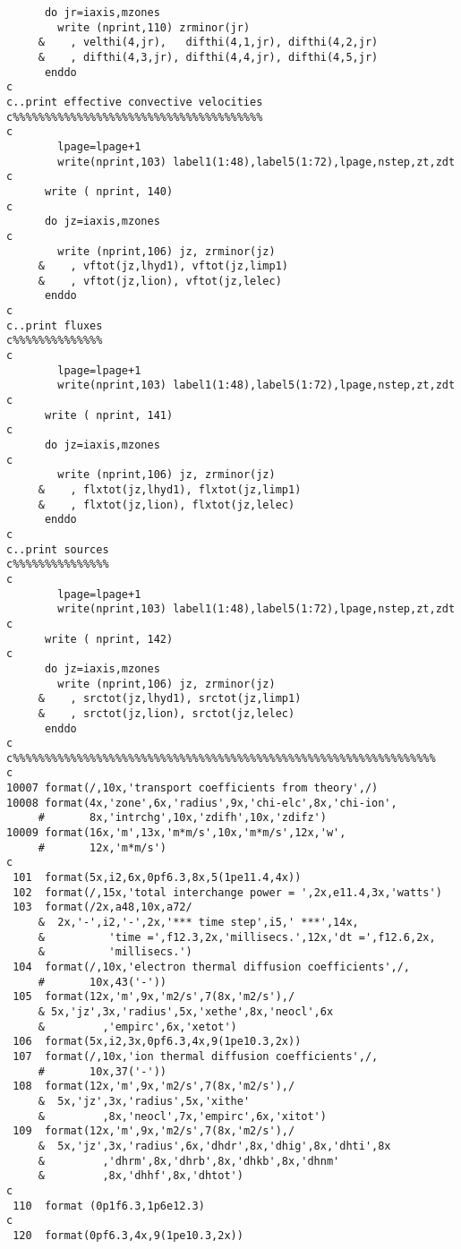 \begin{verbatim}
      do jr=iaxis,mzones
        write (nprint,110) zrminor(jr)
     &    , velthi(4,jr),   difthi(4,1,jr), difthi(4,2,jr)
     &    , difthi(4,3,jr), difthi(4,4,jr), difthi(4,5,jr)
      enddo
c
c..print effective convective velocities
c%%%%%%%%%%%%%%%%%%%%%%%%%%%%%%%%%%%%%%%
c
        lpage=lpage+1
        write(nprint,103) label1(1:48),label5(1:72),lpage,nstep,zt,zdt
c
      write ( nprint, 140)
c
      do jz=iaxis,mzones
c
        write (nprint,106) jz, zrminor(jz)
     &    , vftot(jz,lhyd1), vftot(jz,limp1)
     &    , vftot(jz,lion), vftot(jz,lelec)
      enddo
c
c..print fluxes
c%%%%%%%%%%%%%%
c
        lpage=lpage+1
        write(nprint,103) label1(1:48),label5(1:72),lpage,nstep,zt,zdt
c
      write ( nprint, 141)
c
      do jz=iaxis,mzones
c
        write (nprint,106) jz, zrminor(jz)
     &    , flxtot(jz,lhyd1), flxtot(jz,limp1)
     &    , flxtot(jz,lion), flxtot(jz,lelec)
      enddo
c
c..print sources
c%%%%%%%%%%%%%%%
c
        lpage=lpage+1
        write(nprint,103) label1(1:48),label5(1:72),lpage,nstep,zt,zdt
c
      write ( nprint, 142)
c
      do jz=iaxis,mzones
        write (nprint,106) jz, zrminor(jz)
     &    , srctot(jz,lhyd1), srctot(jz,limp1)
     &    , srctot(jz,lion), srctot(jz,lelec)
      enddo
c
c%%%%%%%%%%%%%%%%%%%%%%%%%%%%%%%%%%%%%%%%%%%%%%%%%%%%%%%%%%%%%%%%%%
c
10007 format(/,10x,'transport coefficients from theory',/)
10008 format(4x,'zone',6x,'radius',9x,'chi-elc',8x,'chi-ion',
     #       8x,'intrchg',10x,'zdifh',10x,'zdifz')
10009 format(16x,'m',13x,'m*m/s',10x,'m*m/s',12x,'w',
     #       12x,'m*m/s')
c
 101  format(5x,i2,6x,0pf6.3,8x,5(1pe11.4,4x))
 102  format(/,15x,'total interchange power = ',2x,e11.4,3x,'watts')
 103  format(/2x,a48,10x,a72/
     &  2x,'-',i2,'-',2x,'*** time step',i5,' ***',14x,
     &          'time =',f12.3,2x,'millisecs.',12x,'dt =',f12.6,2x,
     &          'millisecs.')
 104  format(/,10x,'electron thermal diffusion coefficients',/,
     #       10x,43('-'))
 105  format(12x,'m',9x,'m2/s',7(8x,'m2/s'),/
     & 5x,'jz',3x,'radius',5x,'xethe',8x,'neocl',6x
     &         ,'empirc',6x,'xetot')
 106  format(5x,i2,3x,0pf6.3,4x,9(1pe10.3,2x))
 107  format(/,10x,'ion thermal diffusion coefficients',/,
     #       10x,37('-'))
 108  format(12x,'m',9x,'m2/s',7(8x,'m2/s'),/
     &  5x,'jz',3x,'radius',5x,'xithe'
     &         ,8x,'neocl',7x,'empirc',6x,'xitot')
 109  format(12x,'m',9x,'m2/s',7(8x,'m2/s'),/
     &  5x,'jz',3x,'radius',6x,'dhdr',8x,'dhig',8x,'dhti',8x
     &         ,'dhrm',8x,'dhrb',8x,'dhkb',8x,'dhnm'
     &         ,8x,'dhhf',8x,'dhtot')
c
 110  format (0p1f6.3,1p6e12.3)
c
 120  format(0pf6.3,4x,9(1pe10.3,2x))

\end{verbatim}
